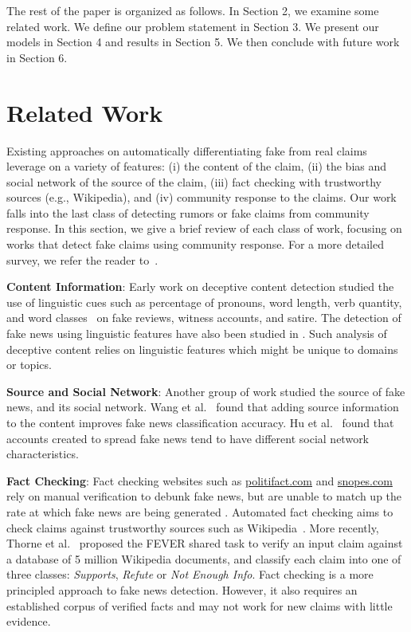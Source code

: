 \documentclass[letterpaper]{article} %
\begin{document}
The rest of the paper is organized as follows. In Section 2, we examine some related work. We define our problem statement in Section 3. We present our models in Section 4 and results in Section 5. We then conclude with future work in Section 6.

\section{Related Work}

Existing approaches on automatically differentiating fake from real claims leverage on a variety of features: (i) the  content of the claim, (ii) the bias and social network of the source of the claim,  (iii) fact checking with trustworthy sources (e.g., Wikipedia), and (iv) community response to the claims. Our work falls into the last class of detecting rumors or fake claims from community response. In this section, we give a brief review of each class of work, focusing on works that detect fake claims using community response. For a more detailed survey, we refer the reader to~\cite{sharma2019}.

\textbf{Content Information}: Early work on deceptive content detection studied the use of linguistic cues such as percentage of pronouns, word length, verb quantity, and word classes~\cite{fuller09,mihalcea09,ott11,rubin16} on fake reviews, witness accounts, and satire. The detection of fake news using linguistic features have also been studied in \cite{obrien18,wang17liar}. Such analysis of deceptive content relies on linguistic features which might be unique to domains or topics. 

\textbf{Source and Social Network}:
Another group of work studied the source of fake news, and its social network. Wang et al.~ found that adding source information to the content improves fake news classification accuracy. Hu et al.~ found that accounts created to spread fake news tend to have different social network characteristics.

\textbf{Fact Checking}:
Fact checking websites such as \url{politifact.com} and \url{snopes.com} rely on manual verification to debunk fake news, but are unable to match up the rate at which fake news are being generated \cite{poynter_2019}. Automated fact checking aims to check claims against trustworthy sources such as Wikipedia~\cite{giovanni15}.  More recently, Thorne et al.~ proposed the FEVER shared task to verify an input claim against a database of 5 million Wikipedia documents, and classify each claim into one of three classes: \textit{Supports}, \textit{Refute} or \textit{Not Enough Info}. Fact checking is a more principled approach to fake news detection. However, it also requires an established corpus of verified facts and may not work for new claims with little evidence. 
\end{document}

